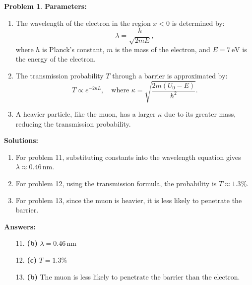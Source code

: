 \documentclass[12pt]{article}
\theoremstyle{definition} %
\newtheorem{problem}{Problem}
\theoremstyle{plain} %
\begin{document}
\begin{problem}
\textbf{Parameters:}
\begin{enumerate}
    \item The wavelength of the electron in the region \(x < 0\) is determined by:
    $$
    \lambda = \frac{h}{\sqrt{2mE}},
    $$
    where \(h\) is Planck's constant, \(m\) is the mass of the electron, and \(E = 7 \, \text{eV}\) is the energy of the electron.
    \item The transmission probability \(T\) through a barrier is approximated by:
    $$
    T \propto e^{-2 \kappa L}, \quad \text{where } \kappa = \sqrt{\frac{2m(U_0 - E)}{\hbar^2}}.
    $$
    \item A heavier particle, like the muon, has a larger \(\kappa\) due to its greater mass, reducing the transmission probability.
\end{enumerate}

\textbf{Solutions:}
\begin{enumerate}
    \item For problem 11, substituting constants into the wavelength equation gives \(\lambda \approx 0.46 \, \text{nm}\).
    \item For problem 12, using the transmission formula, the probability is \(T \approx 1.3\%\).
    \item For problem 13, since the muon is heavier, it is less likely to penetrate the barrier.
\end{enumerate}

\textbf{Answers:}
\begin{enumerate}
    \item[11.] \textbf{(b)} \(\lambda = 0.46 \, \text{nm}\)
    \item[12.] \textbf{(c)} \(T = 1.3\%\)
    \item[13.] \textbf{(b)} The muon is less likely to penetrate the barrier than the electron.
\end{enumerate}
\end{problem}
\end{document}
